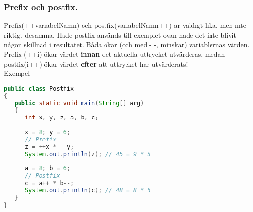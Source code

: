 \documentclass[../main.tex]{subfiles}
\begin{document}
\subsubsection{Prefix och postfix.}
Prefix(++variabelNamn) och postfix(variabelNamn++) är väldigt lika, men inte riktigt desamma. Hade postfix används till exemplet ovan hade det inte blivit någon skillnad i resultatet. Båda ökar (och med - -, minskar) variablernas värden. Prefix (++i) ökar värdet \textbf{innan} det aktuella uttrycket utvärderas, medan postfix(i++) ökar värdet \textbf{efter} att uttrycket har utvärderats!
\\
Exempel 
\begin{lstlisting}[language=java]
public class Postfix 
{
   public static void main(String[] arg)
   {
      int x, y, z, a, b, c;
      
      x = 8; y = 6;
      // Prefix 
      z = ++x * --y;
      System.out.println(z); // 45 = 9 * 5
      
      a = 8; b = 6;
      // Postfix
      c = a++ * b--;
      System.out.println(c); // 48 = 8 * 6
   }
}
\end{lstlisting}
\end{document}
